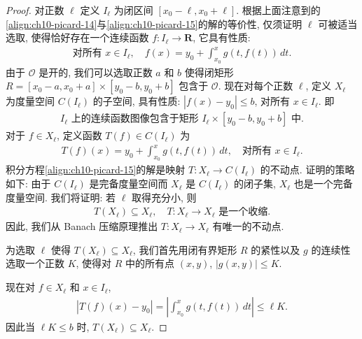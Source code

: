 \documentclass[../../main.tex]{subfiles}
\begin{document}
\begin{proof}
对正数 $\ell$ 定义 $I_{\ell}$ 为闭区间 $[x_{0}-\ell,x_{0}+\ell]$. 根据上面注意到的\eqref{align:ch10-picard-14}与\eqref{align:ch10-picard-15}的解的等价性, 仅须证明 $\ell$ 可被适当选取, 使得恰好存在一个连续函数 $f:I_{\ell}\to\mathbf{R}$, 它具有性质:
\begin{align*}
\text{对所有 }x\in I_{\ell},\quad f(x)=y_{0}+\int_{x_{0}}^{x}g(t,f(t))\,dt.
\end{align*}
由于 $\mathcal{O}$ 是开的, 我们可以选取正数 $a$ 和 $b$ 使得闭矩形 $R=[x_{0}-a,x_{0}+a]\times[y_{0}-b,y_{0}+b]$ 包含于 $\mathcal{O}$. 现在对每个正数 $\ell$, 定义 $X_{\ell}$ 为度量空间 $C(I_{\ell})$ 的子空间, 具有性质: $|f(x)-y_{0}|\leqslant b$, 对所有 $x\in I_{\ell}$. 即
\begin{align*}
I_{\ell}\text{ 上的连续函数图像包含于矩形 }I_{\ell}\times[y_{0}-b,y_{0}+b]\text{ 中}.
\end{align*}
对于 $f\in X_{\ell}$, 定义函数 $T(f)\in C(I_{\ell})$ 为
\begin{align*}
T(f)(x)=y_{0}+\int_{x_{0}}^{x}g(t,f(t))\,dt,\quad\text{对所有 }x\in I_{\ell}.
\end{align*}
积分方程\eqref{align:ch10-picard-15}的解是映射 $T:X_{\ell}\to C(I_{\ell})$ 的不动点. 证明的策略如下: 由于 $C(I_{\ell})$ 是完备度量空间而 $X_{\ell}$ 是 $C(I_{\ell})$ 的闭子集, $X_{\ell}$ 也是一个完备度量空间. 我们将证明: 若 $\ell$ 取得充分小, 则
\begin{align*}
T(X_{\ell})\subseteq X_{\ell},\quad T:X_{\ell}\to X_{\ell}\text{ 是一个收缩}.
\end{align*}
因此, 我们从 Banach 压缩原理推出 $T:X_{\ell}\to X_{\ell}$ 有唯一的不动点.

为选取 $\ell$ 使得 $T(X_{\ell})\subseteq X_{\ell}$, 我们首先用闭有界矩形 $R$ 的紧性以及 $g$ 的连续性选取一个正数 $K$, 使得对 $R$ 中的所有点 $(x,y)$, $|g(x,y)|\leqslant K$.

现在对 $f\in X_{\ell}$ 和 $x\in I_{\ell}$,
\begin{align*}
|T(f)(x)-y_{0}|=\left|\int_{x_{0}}^{x}g(t,f(t))\,dt\right|\leqslant\ell K.
\end{align*}
因此当 $\ell K\leqslant b$ 时, $T(X_{\ell})\subseteq X_{\ell}$.


\end{proof}
\end{document}

